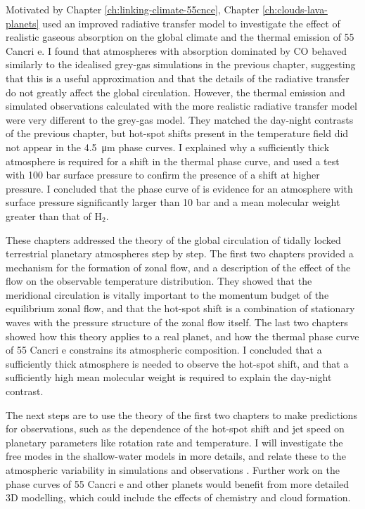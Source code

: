 Motivated by Chapter \ref{ch:linking-climate-55cnce}, Chapter \ref{ch:clouds-lava-planets} used an improved radiative transfer model to investigate the effect of realistic gaseous absorption on the global climate and the thermal emission of 55 Cancri e. I found that atmospheres with absorption dominated by CO behaved similarly to the idealised grey-gas simulations in the previous chapter, suggesting that this is a useful approximation and that the details of the radiative transfer do not greatly affect the global circulation. However, the thermal emission and simulated observations calculated with the more realistic radiative transfer model were very different to the grey-gas model. They matched the day-night contrasts of the previous chapter, but hot-spot shifts present in the temperature field did not appear in the \SI{4.5}{\micro\metre} phase curves. I explained why a sufficiently thick atmosphere is required for a shift in the thermal phase curve, and used a test with 100 bar surface pressure to confirm the presence of a shift at higher pressure. I concluded that the phase curve of \citet{demory201655cnce} is evidence for an atmosphere with surface pressure significantly larger than 10 bar and a mean molecular weight greater than that of H$_{2}$.

These chapters addressed the theory of the global circulation of tidally locked terrestrial planetary atmospheres step by step. The first two chapters provided a mechanism for the formation of zonal flow, and a description of the effect of the flow on the observable temperature distribution. They showed that the meridional circulation is vitally important to the momentum budget of the equilibrium zonal flow, and that the hot-spot shift is a combination of stationary waves with the pressure structure of the zonal flow itself. The last two chapters showed how this theory applies to a real planet, and how the thermal phase curve of  55 Cancri e constrains its atmospheric composition. I concluded that a sufficiently thick atmosphere is needed to observe the hot-spot shift, and that a sufficiently high mean molecular weight is required to explain the day-night contrast.

The next steps are to use the theory of the first two chapters to make predictions for observations, such as the dependence of the hot-spot shift and jet speed on planetary parameters like rotation rate and temperature. I will investigate the free modes in the shallow-water models in more details, and relate these to the atmospheric variability in simulations \citep{pierrehumbert2018review} and observations \citep{demory2015variability, armstrong2017variability}. Further work on the phase curves of 55 Cancri e and other planets would benefit from more detailed 3D modelling, which could include the effects of chemistry and cloud formation.


